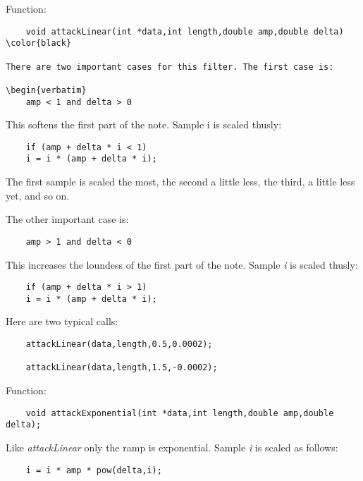 \documentclass{article}
\begin{document}
\htmlrule

Function:

\begin{verbatim}
    void attackLinear(int *data,int length,double amp,double delta)
\color{black}

There are two important cases for this filter. The first case is:

\begin{verbatim}
    amp < 1 and delta > 0
\end{verbatim}

This softens the first part of the note. Sample i is scaled thusly:

\begin{verbatim}
    if (amp + delta * i < 1)
	i = i * (amp + delta * i);
\end{verbatim}

The first sample is scaled the most, the second a little less, the
third, a little less yet, and so on.

The other important case is:

\begin{verbatim}
    amp > 1 and delta < 0
\end{verbatim}

This increases the loundess of the first part of the note.
Sample \emph{i} is scaled thusly:

\begin{verbatim}
    if (amp + delta * i > 1)
	i = i * (amp + delta * i);
\end{verbatim}

Here are two typical calls:

\begin{verbatim}
    attackLinear(data,length,0.5,0.0002);

    attackLinear(data,length,1.5,-0.0002);
\end{verbatim}

\htmlrule

Function:

\begin{verbatim}
    void attackExponential(int *data,int length,double amp,double delta);
\end{verbatim}

Like \emph{attackLinear} only the ramp is exponential.
Sample \emph{i} is scaled
as follows:

\begin{verbatim}
    i = i * amp * pow(delta,i);
\end{verbatim}
\end{document}
